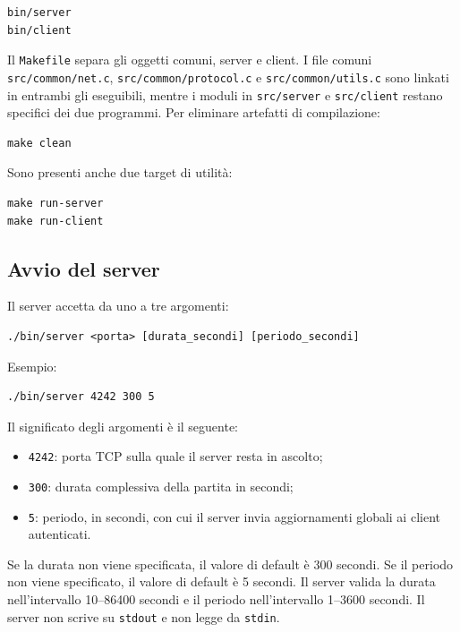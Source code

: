 \documentclass[11pt,a4paper]{article}
\begin{document}
\begin{lstlisting}[style=textstyle]
bin/server
bin/client
\end{lstlisting}

Il \texttt{Makefile} separa gli oggetti comuni, server e client. I file comuni
\texttt{src/common/net.c}, \texttt{src/common/protocol.c} e
\texttt{src/common/utils.c} sono linkati in entrambi gli eseguibili, mentre i
moduli in \texttt{src/server} e \texttt{src/client} restano specifici dei due
programmi. Per eliminare artefatti di compilazione:

\begin{lstlisting}[style=textstyle]
make clean
\end{lstlisting}

Sono presenti anche due target di utilità:

\begin{lstlisting}[style=textstyle]
make run-server
make run-client
\end{lstlisting}

\subsection{Avvio del server}

Il server accetta da uno a tre argomenti:

\begin{lstlisting}[style=textstyle]
./bin/server <porta> [durata_secondi] [periodo_secondi]
\end{lstlisting}

Esempio:

\begin{lstlisting}[style=textstyle]
./bin/server 4242 300 5
\end{lstlisting}

Il significato degli argomenti è il seguente:

\begin{itemize}
    \item \texttt{4242}: porta TCP sulla quale il server resta in ascolto;
    \item \texttt{300}: durata complessiva della partita in secondi;
    \item \texttt{5}: periodo, in secondi, con cui il server invia
    aggiornamenti globali ai client autenticati.
\end{itemize}

Se la durata non viene specificata, il valore di default è 300 secondi. Se il
periodo non viene specificato, il valore di default è 5 secondi. Il server
valida la durata nell'intervallo 10--86400 secondi e il periodo
nell'intervallo 1--3600 secondi.
Il server non scrive su \texttt{stdout} e non legge da \texttt{stdin}.
\end{document}
